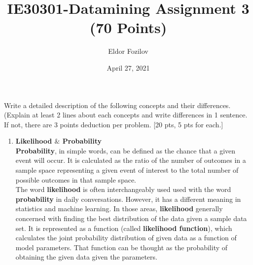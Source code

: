 \documentclass{homework}
\title{IE30301-Datamining Assignment 3 (70 Points)}
\author{Eldor Fozilov}
\date{April 27, 2021}
\begin{document}
    \maketitle
    \exercise*
    Write a detailed description of the following concepts and their differences. (Explain at least 2 lines about each concepts and write differences in 1 sentence. If not, there are 3 points deduction per problem.   [20 pts, 5 pts for each.] \\
    \begin{enumerate}
        \item \textbf{Likelihood $\&$ Probability}  \\
        \textbf{Probability}, in simple words, can be defined as the chance that a given event will occur. It is calculated as the ratio of the number of outcomes in a sample space representing a given event of interest to the total number of possible outcomes in that sample space. \\
        The word \textbf{likelihood} is often interchangeably used used with the word \textbf{probability} in daily conversations. However, it has a different meaning in statistics and machine learning. In those areas, \textbf{likelihood} generally concerned with finding the best distribution of the data given a sample data set. It is represented as a function (called \textbf{likelihood function}), which calculates the joint probability distribution of given data as a function of model parameters. That function can be thought as the probability of obtaining the given data given the parameters. \\
        

\end{enumerate}
\end{document}
